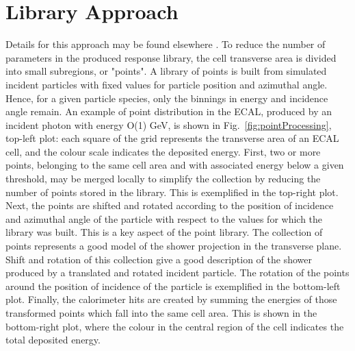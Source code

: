 \documentclass{PoS}
\begin{document}
\section{Library Approach \label{seq:LA}}
Details for this approach may be found elsewhere \cite{chepFastSim}.
To reduce the number of parameters in the produced response library, the
cell transverse area is divided into small subregions, or "points".
A library of points is built from simulated incident particles with
fixed values for particle position and azimuthal angle. Hence, for a
given particle species, only the binnings in energy and incidence angle remain. An example of point distribution in the ECAL, produced by an incident photon with energy O(1) GeV, is shown in Fig.~\ref{fig:pointProcessing}, top-left plot: each square of the grid represents the transverse area of an ECAL cell, and the colour scale indicates the deposited energy.
First, two or more points, belonging to the same cell area and with
associated energy below a given threshold, may be merged locally to
simplify the collection by reducing the number of points stored in
the library. This is exemplified in the top-right plot. Next, the points are shifted and rotated according to the position of
incidence and azimuthal angle of the particle with respect to the
values for which the library was built. This is a key aspect of the
point library. The collection of points represents a good model of the
shower projection in the transverse plane. Shift and
rotation of this collection give a good description of the shower produced by a translated and rotated incident particle. The rotation of the points
around the position of incidence of the particle is exemplified in
the bottom-left plot. Finally, the calorimeter hits are created by
summing the energies of those transformed points which fall into the
same cell area. This is shown in the bottom-right plot, where the
colour in the central region of the cell indicates the total deposited
energy.
\end{document}
